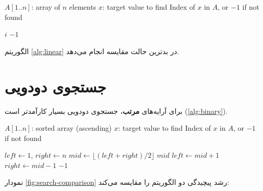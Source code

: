 \documentclass{matinbook}
\begin{document}
\begin{latin}
\begin{algorithm}
\caption{جستجوی خطی}
\label{alg:linear}
\begin{algorithmic}[1]
    \Require $A[1..n]$: array of $n$ elements
    \Require $x$: target value to find
    \Ensure Index of $x$ in $A$, or $-1$ if not found

            \State \Return $i$
        \EndIf
    \EndFor
    \State \Return $-1$
\end{algorithmic}
\end{algorithm}
\end{latin}

\begin{theorem}
    الگوریتم \cref{alg:linear} در بدترین حالت
     مقایسه انجام می‌دهد.
    \label{thm:linear-complexity}
\end{theorem}

\section{جستجوی دودویی}
\label{sec:search-binary}

برای آرایه‌های \textbf{مرتب}، جستجوی
دودویی بسیار
کارآمدتر است (\cref{alg:binary}).

\begin{latin}
\begin{algorithm}
\caption{جستجوی دودویی}
\label{alg:binary}
\begin{algorithmic}[1]
    \Require $A[1..n]$: sorted array (ascending)
    \Require $x$: target value to find
    \Ensure Index of $x$ in $A$, or $-1$ if not found

    \State $left \gets 1$, $right \gets n$
        \State $mid \gets \lfloor (left + right) / 2 \rfloor$
            \State \Return $mid$
            \State $left \gets mid + 1$
        \Else
            \State $right \gets mid - 1$
        \EndIf
    \EndWhile
    \State \Return $-1$
\end{algorithmic}
\end{algorithm}
\end{latin}

نمودار \cref{fig:search-comparison} رشد پیچیدگی دو
الگوریتم را مقایسه می‌کند:
\end{document}
